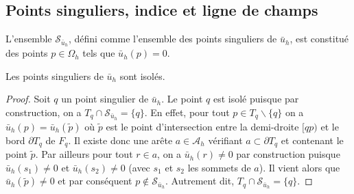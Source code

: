\subsection{Points singuliers, indice et ligne de champs}

L'ensemble $\mathcal{S}_{\bar{u}_h}$, défini comme l'ensemble des points singuliers de $\bar{u}_h$, est constitué des points $p \in \Omega_h$ tels que $\bar{u}_h(p) = 0$.
\begin{lemma}
    Les points singuliers de $\bar{u}_h$ sont isolés.
\end{lemma}
\begin{proof}
    Soit $q$ un point singulier de $\bar{u}_h$. Le point $q$ est isolé puisque par construction, on a $T_q\cap\mathcal{S}_{\bar{u}_h}=\{q\}$. En effet, pour tout $p\in T_q\backslash\{q\}$ on a $\bar{u}_h(p)=\bar{u}_h(\widetilde{p})$ où $\widetilde{p}$ est le point d'intersection entre la demi-droite $[qp)$ et le bord $\partial T_q$ de $F_q$. Il existe donc une arête $a\in\mathcal{A}_h$ vérifiant $a\subset\partial T_q$ et contenant le point $\widetilde{p}$. Par ailleurs pour tout $r\in a$, on a $\bar{u}_h(r)\neq 0$ par construction puisque $\bar{u}_h(s_1)\neq 0$ et $\bar{u}_h(s_2)\neq 0$ (avec $s_1$ et $s_2$ les sommets de $a$). Il vient alors que $\bar{u}_h(\widetilde{p})\neq 0$ et par conséquent $p\notin \mathcal{S}_{\bar{u}_h}$. Autrement dit, $T_q\cap\mathcal{S}_{\bar{u}_h}=\{q\}$.
\end{proof}

